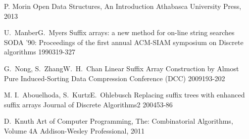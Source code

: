 \knjigaEnAvtor
    {P. Morin}
    {Open Data Structures, An Introduction}
    {Athabasca University Press, 2013}

\konferencniClanekVecAvtorjev
    {U.~Manber}{G.~Myers}
    {Suffix arrays: a new method for on-line string searches}
    {SODA '90: Proceedings of the first annual ACM-SIAM symposium on Discrete algorithms}
    {1990}{319-327}

\konferencniClanekVecAvtorjev
    {G.~Nong, S.~Zhang}{W.~H.~Chan}
    {Linear Suffix Array Construction by Almost Pure Induced-Sorting}
    {Data Compression Conference (DCC)}
    {2009}{193-202}

\clanekVRevijiVecAvtorjev
    {M. I.~Abouelhoda, S.~Kurtz}{E.~Ohlebusch}
    {Replacing suffix trees with enhanced suffix arrays}
    {Journal of Discrete Algorithms}{2}
    {2004}{53-86} 

\knjigaEnAvtor
    {D.~Knuth}
    {Art of Computer Programming, The: Combinatorial Algorithms, Volume 4A}
    {Addison-Wesley Professional, 2011}



